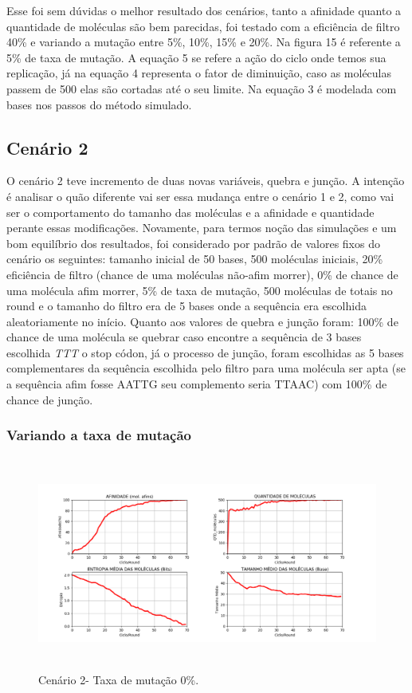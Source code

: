 Esse foi sem dúvidas o melhor resultado dos cenários, tanto a afinidade quanto a
quantidade de moléculas são bem parecidas, foi testado com a eficiência de filtro 40\% e
variando a mutação entre 5\%, 10\%, 15\% e 20\%. Na figura 15 é referente a 5\% de taxa de
mutação. A equação 5 se refere a ação do ciclo onde temos sua replicação, já na equação
4 representa o fator de diminuição, caso as moléculas passem de 500 elas são cortadas até
o seu limite. Na equação 3 é modelada com bases nos passos do método simulado.

\subsection{Cenário 2}

O cenário 2 teve incremento de duas novas variáveis, quebra e junção. A intenção é
analisar o quão diferente vai ser essa mudança entre o cenário 1 e 2, como vai ser o
comportamento do tamanho das moléculas e a afinidade e quantidade perante essas
modificações. Novamente, para termos noção das simulações e um bom equilíbrio dos
resultados, foi considerado por padrão de valores fixos do cenário os seguintes: tamanho
inicial de 50 bases, 500 moléculas iniciais, 20\% eficiência de filtro (chance de uma
moléculas não-afim morrer), 0\% de chance de uma molécula afim morrer, 5\% de taxa de
mutação, 500 moléculas de totais no round e o tamanho do filtro era de 5 bases onde a
sequência era escolhida aleatoriamente no início. Quanto aos valores de quebra e junção
foram: 100\% de chance de uma molécula se quebrar caso encontre a sequência de 3 bases
escolhida \emph{TTT} o stop códon, já o processo de junção, foram escolhidas as 5 bases
complementares da sequência escolhida pelo filtro para uma molécula ser apta (se a
sequência afim fosse AATTG seu complemento seria TTAAC) com 100\% de chance de junção.

\subsubsection{Variando a taxa de mutação}

\begin{figure}[!h]
    \centering
    \includegraphics[width=15cm,height=7cm]{figures/image15_alpha00_beta_20.png}
    \caption{Cenário 2- Taxa de mutação 0\%.}
    \label{fig:image15_alpha00_beta_20}
\end{figure}

